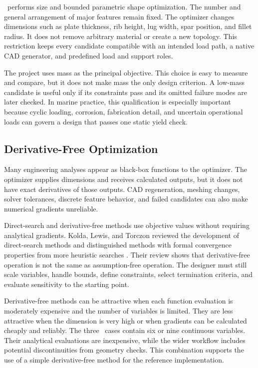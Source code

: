 \NEMO\ performs size and bounded parametric shape optimization. The number and
general arrangement of major features remain fixed. The optimizer changes
dimensions such as plate thickness, rib height, lug width, spar position, and
fillet radius. It does not remove arbitrary material or create a new topology.
This restriction keeps every candidate compatible with an intended load path,
a native CAD generator, and predefined load and support roles.

The project uses mass as the principal objective. This choice is easy to
measure and compare, but it does not make mass the only design criterion. A
low-mass candidate is useful only if its constraints pass and its omitted
failure modes are later checked. In marine practice, this qualification is
especially important because cyclic loading, corrosion, fabrication detail,
and uncertain operational loads can govern a design that passes one static
yield check.

\subsection{Derivative-Free Optimization}
\label{sec:derivative-free}

Many engineering analyses appear as black-box functions to the optimizer. The
optimizer supplies dimensions and receives calculated outputs, but it does not
have exact derivatives of those outputs. CAD regeneration, meshing changes,
solver tolerances, discrete feature behavior, and failed candidates can also
make numerical gradients unreliable.

Direct-search and derivative-free methods use objective values without
requiring analytical gradients. Kolda, Lewis, and Torczon reviewed the
development of direct-search methods and distinguished methods with formal
convergence properties from more heuristic searches \cite{kolda2003}. Their
review shows that derivative-free operation is not the same as assumption-free
operation. The designer must still scale variables, handle bounds, define
constraints, select termination criteria, and evaluate sensitivity to the
starting point.

Derivative-free methods can be attractive when each function evaluation is
moderately expensive and the number of variables is limited. They are less
attractive when the dimension is very high or when gradients can be calculated
cheaply and reliably. The three \NEMO\ cases contain six or nine continuous
variables. Their analytical evaluations are inexpensive, while the wider
workflow includes potential discontinuities from geometry checks. This
combination supports the use of a simple derivative-free method for the
reference implementation.

